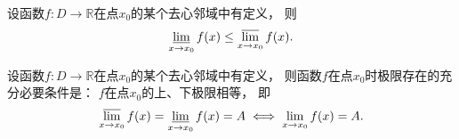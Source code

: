 \begin{property}
设函数\(f\colon D\to\mathbb{R}\)在点\(x_0\)的某个去心邻域中有定义，
则\begin{equation*}
	\varliminf_{x \to x_0} f(x) \leq \varlimsup_{x \to x_0} f(x).
\end{equation*}
\end{property}

\begin{theorem}
设函数\(f\colon D\to\mathbb{R}\)在点\(x_0\)的某个去心邻域中有定义，
则函数\(f\)在点\(x_0\)时极限存在的充分必要条件是：
\(f\)在点\(x_0\)的上、下极限相等，
即\begin{equation*}
	\varlimsup_{x \to x_0} f(x)
	= \varliminf_{x \to x_0} f(x)
	= A
	\iff
	\lim_{x \to x_0} f(x) = A.
\end{equation*}
\end{theorem}
